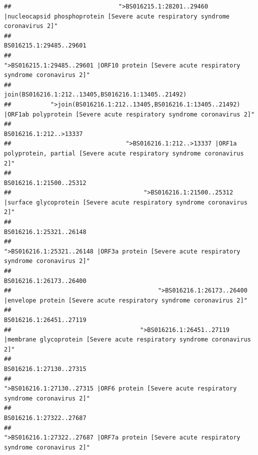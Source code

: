\documentclass[
]{article}
\begin{document}
\begin{verbatim}
##                              ">BS016215.1:28201..29460 |nucleocapsid phosphoprotein [Severe acute respiratory syndrome coronavirus 2]" 
##                                                                                                                BS016215.1:29485..29601 
##                                            ">BS016215.1:29485..29601 |ORF10 protein [Severe acute respiratory syndrome coronavirus 2]" 
##                                                                                    join(BS016216.1:212..13405,BS016216.1:13405..21492) 
##           ">join(BS016216.1:212..13405,BS016216.1:13405..21492) |ORF1ab polyprotein [Severe acute respiratory syndrome coronavirus 2]" 
##                                                                                                                 BS016216.1:212..>13337 
##                                ">BS016216.1:212..>13337 |ORF1a polyprotein, partial [Severe acute respiratory syndrome coronavirus 2]" 
##                                                                                                                BS016216.1:21500..25312 
##                                     ">BS016216.1:21500..25312 |surface glycoprotein [Severe acute respiratory syndrome coronavirus 2]" 
##                                                                                                                BS016216.1:25321..26148 
##                                            ">BS016216.1:25321..26148 |ORF3a protein [Severe acute respiratory syndrome coronavirus 2]" 
##                                                                                                                BS016216.1:26173..26400 
##                                         ">BS016216.1:26173..26400 |envelope protein [Severe acute respiratory syndrome coronavirus 2]" 
##                                                                                                                BS016216.1:26451..27119 
##                                    ">BS016216.1:26451..27119 |membrane glycoprotein [Severe acute respiratory syndrome coronavirus 2]" 
##                                                                                                                BS016216.1:27130..27315 
##                                             ">BS016216.1:27130..27315 |ORF6 protein [Severe acute respiratory syndrome coronavirus 2]" 
##                                                                                                                BS016216.1:27322..27687 
##                                            ">BS016216.1:27322..27687 |ORF7a protein [Severe acute respiratory syndrome coronavirus 2]" 

\end{verbatim}
\end{document}
